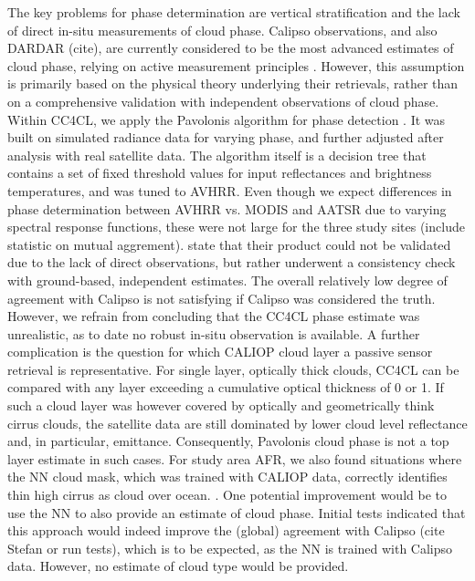 The key problems for phase determination are vertical stratification and the lack of direct in-situ measurements of cloud phase. Calipso observations, and also DARDAR (cite), are currently considered to be the most advanced estimates of cloud phase, relying on active measurement principles \citep{Winker09,Karlsson10}. However, this assumption is primarily based on the physical theory underlying their retrievals, rather than on a comprehensive validation with independent observations of cloud phase. Within CC4CL, we apply the Pavolonis algorithm for phase detection \citep{Pavolonis05}. It was built on simulated radiance data for varying phase, and further adjusted after analysis with real satellite data. The algorithm itself is a decision tree that contains a set of fixed threshold values for input reflectances and brightness temperatures, and was tuned to AVHRR. Even though we expect differences in phase determination between AVHRR vs. MODIS and AATSR due to varying spectral response functions, these were not large for the three study sites (include statistic on mutual aggrement). \citet{Pavolonis05} state that their product could not be validated due to the lack of direct observations, but rather underwent a consistency check with ground-based, independent estimates. The overall relatively low degree of agreement with Calipso is not satisfying if Calipso was considered the truth. However, we refrain from concluding that the CC4CL phase estimate was unrealistic, as to date no robust in-situ observation is available. A further complication is the question for which CALIOP cloud layer a passive sensor retrieval is representative. For single layer, optically thick clouds, CC4CL can be compared with any layer exceeding a cumulative optical thickness of 0 or 1. If such a cloud layer was however covered by optically and geometrically think cirrus clouds, the satellite data are still dominated by lower cloud level reflectance and, in particular, emittance. Consequently, Pavolonis cloud phase is not a top layer estimate in such cases. For study area AFR, we also found situations where the NN cloud mask, which was trained with CALIOP data, correctly identifies thin high cirrus as cloud over ocean. . One potential improvement would be to use the NN to also provide an estimate of cloud phase. Initial tests indicated that this approach would indeed improve the (global) agreement with Calipso (cite Stefan or run tests), which is to be expected, as the NN is trained with Calipso data. However, no estimate of cloud type would be provided.



